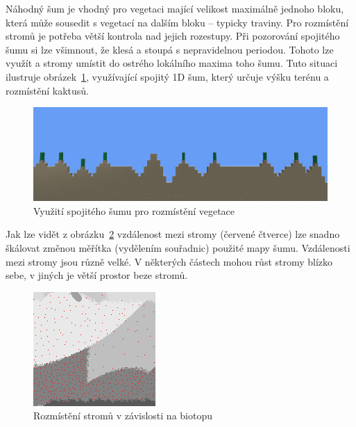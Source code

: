 \documentclass[thesis=M,czech]{FITthesis}[2019/12/23]
\begin{document}
Náhodný šum je vhodný pro vegetaci mající velikost maximálně jednoho bloku, která může sousedit s vegetací na dalším bloku -- typicky traviny. Pro rozmístění stromů je potřeba větší kontrola nad jejich rozestupy. Při pozorování spojitého šumu si lze všimnout, že klesá a stoupá s nepravidelnou periodou. Tohoto lze využít a stromy umístit do ostrého lokálního maxima toho šumu. Tuto situaci ilustruje obrázek~\ref{fig:cactus}, využívající spojitý 1D šum, který určuje výšku terénu a rozmístění kaktusů.

\begin{figure}\centering
	\includegraphics[width=\textwidth]{images/world_gen/cactus}
	\caption[Využití spojitého šumu pro rozmístění vegetace]{Využití spojitého šumu pro rozmístění vegetace}\label{fig:cactus}
\end{figure}

Jak lze vidět z obrázku~\ref{fig:trees} vzdálenost mezi stromy (červené čtverce) lze snadno škálovat změnou měřítka (vydělením souřadnic) použité mapy šumu. Vzdálenosti mezi stromy jsou různě velké. V některých částech mohou růst stromy blízko sebe, v jiných je větší prostor beze stromů.

\begin{figure}\centering
	\includegraphics[width=\textwidth]{images/world_gen/trees}
	\caption[Rozmístění stromů v závislosti na biotopu]{Rozmístění stromů v závislosti na biotopu}\label{fig:trees}
\end{figure}
\end{document}
